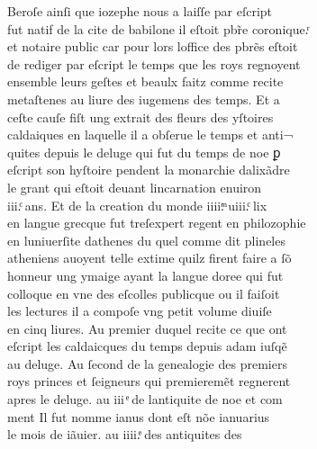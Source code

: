 \documentclass[12pt]{article}
\begin{document}
Beroſe ainſi que iozephe nous a laiſſe par eſcript\\
fut natif de la cite de babilone il eſtoit pbr̃e coronique.ͬ\\
et notaire public
          car pour lors loffice des pbrẽs eſtoit\\
de rediger par eſcript le temps que les
          roys regnoyent\\
ensemble leurs geſtes et beaulx faitz comme recite\\
metaſtenes au liure des iugemens des temps. Et a\\
ceſte cauſe
          fiſt ung extrait des fleurs des yſtoires\\
caldaiques en laquelle il a obſerue le temps et anti¬\\
quites depuis le
          deluge qui fut du temps de noe ꝑ\\
eſcript son
          hyſtoire pendent la monarchie dalixãdre\\
le grant qui eſtoit deuant lincarnation enuiron\\
iii.ͨ ans. Et de la creation
          du monde iiii.ͫ uiii.ͨ lix\\
en langue grecque fut treſexpert regent en
            philozophie\\
en luniuerſite dathenes du quel comme dit plineles\\
atheniens auoyent telle extime quilz firent faire a ſõ\\
honneur ung ymaige ayant la langue doree qui fut\\
colloque en vne des
              eſcolles publicque ou il faiſoit\\
les lectures  il a compoſe vng petit volume diuiſe\\
en cinq
            liures. Au premier duquel recite ce que ont\\
eſcript les caldaicques du
          temps depuis adam iuſqẽ\\
au
          deluge. Au ſecond de la genealogie des premiers\\
roys princes et ſeigneurs qui
          premieremẽt regnerent\\
apres le deluge. au iii ͤ de lantiquite de noe et com\\
ment Il fut nomme 
            ianus dont eſt nõe ianuarius\\
le mois de iãuier. au iiii.ͤ des
          antiquites des
\end{document}
